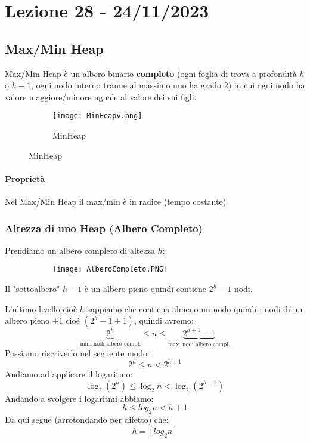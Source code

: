 \section{Lezione 28 - 24/11/2023}
\subsection{Max/Min Heap}
Max/Min Heap è un albero binario \textbf{completo} (ogni foglia di trova a profondità $h$ o $h-1$, ogni nodo interno tranne al massimo uno ha grado 2) in cui ogni nodo ha valore maggiore/minore uguale al valore dei sui figli.
\begin{figure}[H]
	\centering
	\begin{subfigure}[b]{0.60\textwidth}
		\texttt{[image: MinHeapv.png]} 
		\caption*{MinHeap}
	\end{subfigure}
\end{figure} 
\paragraph{Proprietà} Nel Max/Min Heap il max/min è in radice (tempo costante) 




\subsubsection{Altezza di uno Heap (Albero Completo)}
Prendiamo un albero completo di altezza $h$:
\begin{figure}[H]
	\centering
	\begin{subfigure}[b]{0.40\textwidth}
		\texttt{[image: AlberoCompleto.PNG]} 
	\end{subfigure}
\end{figure} 
Il "sottoalbero" $h-1$ è un albero pieno quindi contiene $2^h-1$ nodi.\smallskip

L'ultimo livello cioè $h$ sappiamo che contiena almeno un nodo quindi i nodi di un albero pieno $+1$ cioé $(2^h-1 +1)$, quindi avremo:
$$ \underbrace{2^h}_{\text{min. nodi albero compl.}} \le n \le \underbrace{2^{h+1}-1}_{\text{max. nodi albero compl.}}$$
Possiamo riscriverlo nel seguente modo:
$$ 2^h \le n < 2^{h+1} $$
Andiamo ad applicare il logaritmo:
$$ \log_2(2^h) \le \log_2 n < \log_2(2^{h+1})$$
Andando a svolgere i logaritmi abbiamo:
$$ h \le log_2 n < h+1$$
Da qui segue (arrotondando per difetto) che:
$$ h=[log_2 n]$$

